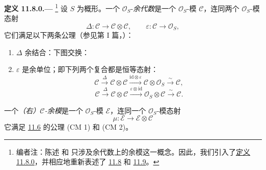 \medskip
{}\label{def:sga3-VIB-11.8.0}%
\noindent\textbf{定义 11.8.0.---}%
\footnote{\label{note:sga3-VIB-112}编者注：陈述  和  只涉及余代数上的余模这一概念。因此，我们引入了\hyperref[def:sga3-VIB-11.8.0]{定义 11.8.0}，并相应地重新表述了 \hyperref[lem:sga3-VIB-11.8]{11.8} 和 \hyperref[prop:sga3-VIB-11.9]{11.9}。}
设 \(S\) 为概形。一个 \(\mathcal O_S\)-\emph{余代数}是一个 \(\mathcal O_S\)-模 \(\mathcal C\)，连同两个 \(\mathcal O_S\)-模态射
\[
  \Delta:\mathcal C\longrightarrow\mathcal C\otimes\mathcal C,
  \qquad
  \varepsilon:\mathcal C\longrightarrow\mathcal O_S,
\]
它们满足以下两条公理\textup{（参见第 I 篇，）}：
\begin{enumerate}
\item[\textup{(CO 1)}]\label{ax:sga3-VIB-11.8.0-CO1}
  \(\Delta\) 余结合：下图交换：
  \begin{center}
    \label{diag:sga3-VIB-11.8.0-coassociativity}%
  \end{center}

\item[\textup{(CO 2)}]\label{ax:sga3-VIB-11.8.0-CO2}
  \(\varepsilon\) 是余单位；即下列两个复合都是恒等态射：
  \label{form:sga3-VIB-11.8.0-counit-right}%
  \[
    \mathcal C\xrightarrow{\Delta}
    \mathcal C\otimes\mathcal C
    \xrightarrow{\mathrm{id}\otimes\varepsilon}
    \mathcal C\otimes\mathcal O_S
    \xrightarrow{\sim}\mathcal C,
  \]
  \label{form:sga3-VIB-11.8.0-counit-left}%
  \[
    \mathcal C\xrightarrow{\Delta}
    \mathcal C\otimes\mathcal C
    \xrightarrow{\varepsilon\otimes\mathrm{id}}
    \mathcal O_S\otimes\mathcal C
    \xrightarrow{\sim}\mathcal C.
  \]
\end{enumerate}

一个\emph{（右）\(\mathcal C\)-余模}是一个 \(\mathcal O_S\)-模 \(\mathcal E\)，连同一个 \(\mathcal O_S\)-模态射
\[
  \mu:\mathcal E\longrightarrow\mathcal E\otimes\mathcal C
\]
它满足 \hyperref[par:sga3-VIB-11.6]{11.6} 的公理 \textup{(CM 1)} 和 \textup{(CM 2)}。

